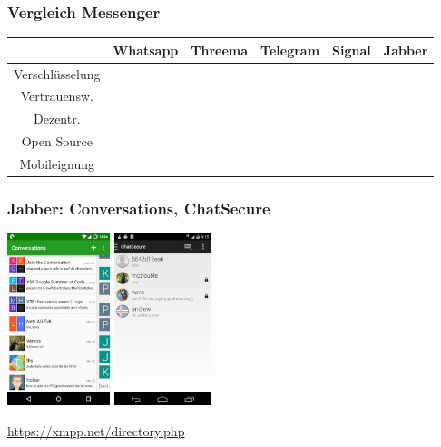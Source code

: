 \documentclass[12pt, xcolor={svgnames,table}]{beamer}
\begin{document}
\begin{frame}
  \frametitle{Vergleich Messenger}
  \small
  \begin{tabular}{|c|c|c|c|c|c|}
    \hline
                      & Whatsapp            & Threema             & Telegram              & Signal                & Jabber              \\
    \hline
    Verschlüsselung   & \cellcolor{orange}  & \cellcolor{yellow}  & \cellcolor{orange}    & \cellcolor{green}     & \cellcolor{green}   \\
    \hline
    Vertrauensw.      & \cellcolor{red}     & \cellcolor{yellow}  & \cellcolor{orange}    & \cellcolor{green}     & \cellcolor{green}   \\
    \hline
    Dezentr.          & \cellcolor{red}     & \cellcolor{red}     & \cellcolor{red}       & \cellcolor{orange}    & \cellcolor{green}   \\
    \hline
    Open Source       & \cellcolor{red}     & \cellcolor{red}     & \cellcolor{yellow}    & \cellcolor{green}     & \cellcolor{green}   \\
    \hline
    Mobileignung      & \cellcolor{green}   & \cellcolor{green}   & \cellcolor{green}     & \cellcolor{green}     & \cellcolor{yellow}  \\
    \hline
  \end{tabular}
\end{frame}

\begin{frame}
  \frametitle{Jabber: Conversations, ChatSecure}
    \begin{center}
      \includegraphics[height=5cm]{img/conversations.png}
      \hspace{0.5cm}
      \includegraphics[height=5cm]{img/chatsecure.png}
    \end{center}
    \url{https://xmpp.net/directory.php}
\end{frame}
\end{document}
